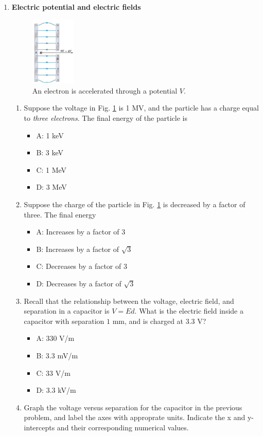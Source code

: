 \documentclass[10pt]{article}
\begin{document}
\begin{enumerate}
\item \textbf{Electric potential and electric fields}
\begin{figure}[hb]
\centering
\includegraphics[width=0.2\textwidth]{figures/plate2.png}
\caption{\label{fig:plate2} An electron is accelerated through a potential $V$.}
\end{figure}
\begin{enumerate}
\item Suppose the voltage in Fig. \ref{fig:plate2} is 1 MV, and the particle has a charge equal to \textit{three electrons}.  The final energy of the particle is
\begin{itemize}
\item A: 1 keV
\item B: 3 keV
\item C: 1 MeV
\item D: 3 MeV
\end{itemize}
\item Suppose the charge of the particle in Fig. \ref{fig:plate2} is decreased by a factor of three.  The final energy
\begin{itemize}
\item A: Increases by a factor of 3
\item B: Increases by a factor of $\sqrt{3}$
\item C: Decreases by a factor of 3
\item D: Decreases by a factor of $\sqrt{3}$
\end{itemize}
\item Recall that the relationship between the voltage, electric field, and separation in a capacitor is $V = E d$.  What is the electric field inside a capacitor with separation $1$ mm, and is charged at $3.3$ V?
\begin{itemize}
\item A: 330 V/m
\item B: 3.3 mV/m
\item C: 33 V/m
\item D: 3.3 kV/m
\end{itemize}
\item Graph the voltage versus separation for the capacitor in the previous problem, and label the axes with approprate units.  Indicate the x and y-intercepts and their corresponding numerical values. \\ \vspace{3cm}

\end{enumerate}
\end{enumerate}
\end{document}

